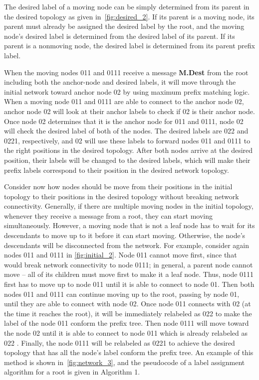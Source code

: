 \documentclass[10pt,conference]{IEEEtran}
\begin{document}
The desired label of a moving node can be simply
determined from its parent in the desired topology as given
in~\autoref{fig:desired_2}. If its parent is a moving node, its
parent must already be assigned the desired label by the root, and the
moving node's desired label is determined from  the desired label
of its parent. If its parent is a nonmoving node, the desired
label is determined from its parent prefix label.

When the moving nodes 011 and 0111 receive a message {\bf M.Dest} from
the root including both the anchor-node and desired labels, it will
move through the initial network toward anchor node 02 by using
maximum prefix matching logic.  When a moving node 011 and 0111 are
able to connect to the anchor node 02, anchor node 02 will look at
their anchor labels to check if 02 is their anchor node.  Once node 02
determines that it is the anchor node for 011 and 0111, node 02 will
check the desired label of both of the nodes.  The desired labels are
022 and 0221, respectively, and 02 will use these labels to forward
nodes 011 and 0111 to the right positions in the desired topology.
After both nodes arrive at the desired position, their labels will be
changed to the desired labels, which will make their prefix labels
correspond to their position in the desired network topology.

Consider now how nodes should be move from their positions in the
initial topology to their positions in the desired topology without
breaking network connectivity.  Generally, if there are multiple
moving nodes in the initial topology, whenever they receive a message
from a root, they can start moving simultaneously. However, a moving
node that is not a leaf node has to wait for its descendants to move
up to it before it can start moving.  Otherwise, the node's
descendants will be disconnected from the network.  For example,
consider again nodes 011 and 0111 in \autoref{fig:initial_2}. Node 011
cannot move first, since that would break network connectivity to node
0111; in general, a parent node cannot move -- all of its children
must move first to make it a leaf node.  Thus, node 0111 first has to
move up to node 011 until it is able to connect to node 01.  Then both
nodes 011 and 0111 can continue moving up to the root, passing by node
01, until they are able to connect with node 02.  Once node 011
connects with 02 (at the time it reaches the root), it will be
immediately relabeled as 022 to make the label of the node 011 conform
the prefix tree.  Then node 0111 will move toward the node 02 until it
is able to connect to node 011 which is already relabeled as 022
. Finally, the node 0111 will be relabeled as 0221 to achieve the
desired topology that has all the node's label conform the prefix
tree.  An example of this method is shown in~\autoref{fig:network_3},
and the pseudocode of a label assignment algorithm for a root is given
in Algorithm 1.
\end{document}
